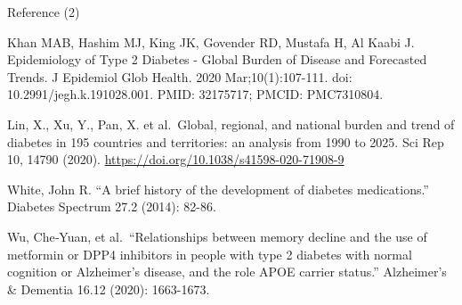 \documentclass[
  ignorenonframetext,
  twocolumn]{beamer}
\begin{document}
\begin{frame}{Reference (2)}
\protect\hypertarget{reference-2}{}
\small

Khan MAB, Hashim MJ, King JK, Govender RD, Mustafa H, Al Kaabi J.
Epidemiology of Type 2 Diabetes - Global Burden of Disease and
Forecasted Trends. J Epidemiol Glob Health. 2020 Mar;10(1):107-111. doi:
10.2991/jegh.k.191028.001. PMID: 32175717; PMCID: PMC7310804.

Lin, X., Xu, Y., Pan, X. et al.~Global, regional, and national burden
and trend of diabetes in 195 countries and territories: an analysis from
1990 to 2025. Sci Rep 10, 14790 (2020).
\url{https://doi.org/10.1038/s41598-020-71908-9}

White, John R. ``A brief history of the development of diabetes
medications.'' Diabetes Spectrum 27.2 (2014): 82-86.

Wu, Che‐Yuan, et al.~``Relationships between memory decline and the use
of metformin or DPP4 inhibitors in people with type 2 diabetes with
normal cognition or Alzheimer's disease, and the role APOE carrier
status.'' Alzheimer's \& Dementia 16.12 (2020): 1663-1673.
\end{frame}
\end{document}
